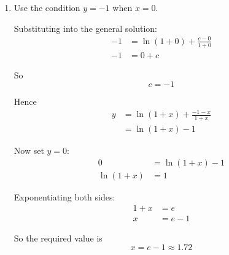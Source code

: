 \documentclass[leqno]{article}
\begin{document}
\begin{enumerate}[
  label=\textbf{\arabic*.},
  leftmargin=*,
  topsep=0pt,
  partopsep=0pt,
  parsep=0pt
]
\begin{djsSolution}
\begin{enumerate}[label=\textbf{(\alph*)}]
Integrating both sides with respect to $x$:
\begin{align*}
(1+x)y&=\int \ln(1+x)\, \mathrm{d}x + c
\end{align*}

Integrate by parts with
\[
u=\ln(1+x),\qquad \frac{\mathrm{d}v}{\mathrm{d}x}=1
\]

so that
\[
\frac{\mathrm{d}u}{\mathrm{d}x}=\frac{1}{1+x},\qquad v=x
\]

Using integration by parts:
\[
\int u\frac{\mathrm{d}v}{\mathrm{d}x}\,\mathrm{d}x = uv - \int v\frac{\mathrm{d}u}{\mathrm{d}x}\,\mathrm{d}x
\]

So
\[
\int \ln(1+x)\, \mathrm{d}x=x\ln(1+x)-\int \frac{x}{1+x}\,\mathrm{d}x
\]

Writing $\frac{x}{1+x}=1-\frac{1}{1+x}$ gives
\begin{align*}
\int \ln(1+x)\, \mathrm{d}x&=x\ln(1+x)-\int \left(1-\frac{1}{1+x}\right)\,\mathrm{d}x \\
&=x\ln(1+x)-x+\ln(1+x) \\
&=(1+x)\ln(1+x)-x
\end{align*}

So
\[
(1+x)y=(1+x)\ln(1+x)-x+c
\]

Dividing by $1+x$, which is positive since $x>-1$, gives the general solution
\[
y=\ln(1+x)+\frac{c-x}{1+x}
\]

  \item Use the condition $y=-1$ when $x=0$.

Substituting into the general solution:
\begin{align*}
-1&=\ln(1+0)+\frac{c-0}{1+0} \\
-1&=0+c
\end{align*}

So
\[
c=-1
\]

Hence
\begin{align*}
y&=\ln(1+x)+\frac{-1-x}{1+x} \\
&=\ln(1+x)-1
\end{align*}

Now set $y=0$:
\begin{align*}
0&=\ln(1+x)-1 \\
\ln(1+x)&=1
\end{align*}

Exponentiating both sides:
\begin{align*}
1+x&=e \\
x&=e-1
\end{align*}

So the required value is
\[
x=e-1\approx 1.72
\]
\end{enumerate}
\end{djsSolution}



\end{enumerate}
\end{document}
